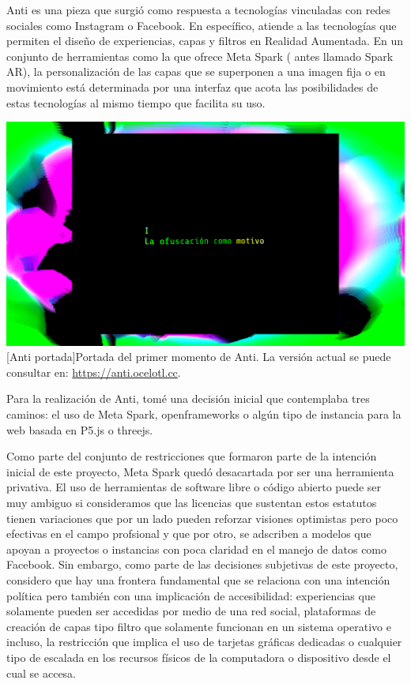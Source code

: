 Anti es una pieza que surgió como respuesta a tecnologías vinculadas con redes sociales como Instagram o Facebook. En específico, atiende a las tecnologías que permiten el diseño de experiencias, capas y filtros en Realidad Aumentada. En un conjunto de herramientas como la que ofrece Meta Spark ( antes llamado Spark AR), la personalización de las capas que se superponen a una imagen fija o en movimiento está determinada por una interfaz que acota las posibilidades de estas tecnologías al mismo tiempo que facilita su uso.

\begin{Figure}
\includegraphics[width=\columnwidth]{../img/antiHydra1.png}
[Anti portada]{Portada del primer momento de Anti. La versión actual se puede consultar en: \url{https://anti.ocelotl.cc}.} %
\label{fig:gallery} 
\end{Figure}

Para la realización de Anti, tomé una decisión inicial que contemplaba tres caminos: el uso de Meta Spark, \Gls{openframeworks} o algún tipo de instancia para la web basada en P5.js o \Gls{threejs}.

Como parte del conjunto de restricciones que formaron parte de la intención inicial de este proyecto, Meta Spark quedó desacartada por ser una herramienta privativa. El uso de herramientas de software libre o código abierto puede ser muy ambiguo si consideramos que las licencias que sustentan estos estatutos tienen variaciones que por un lado pueden reforzar visiones optimistas pero poco efectivas en el campo profsional y que por otro, se adscriben a modelos que apoyan a proyectos o instancias con poca claridad en el manejo de datos como Facebook. Sin embargo, como parte de las decisiones subjetivas de este proyecto, considero que hay una frontera fundamental que se relaciona con una intención política pero también con una implicación de accesibilidad: experiencias que solamente pueden ser accedidas por medio de una red social, plataformas de creación de capas tipo filtro que solamente funcionan en un sistema operativo e incluso, la restricción que implica el uso de tarjetas gráficas dedicadas o cualquier tipo de escalada en los recursos físicos de la computadora o dispositivo desde el cual se accesa.


